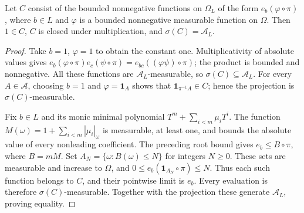 \begin{lemma}\label{lem:bounded-evaluation-generators}
\leanok
{}
Let $C$ consist of the bounded nonnegative functions on $\Omega_L$ of
the form $e_b(\varphi\circ\pi)$, where $b\in L$ and $\varphi$ is a
bounded nonnegative measurable function on $\Omega$. Then $1\in C$,
$C$ is closed under multiplication, and $\sigma(C)=\mathcal A_L$.
\end{lemma}
\begin{proof}
Take $b=1$, $\varphi=1$ to obtain the constant one. Multiplicativity
of absolute values gives
$e_b(\varphi\circ\pi)e_c(\psi\circ\pi)=e_{bc}((\varphi\psi)\circ\pi)$;
the product is bounded and nonnegative. All these functions are
$\mathcal A_L$-measurable, so $\sigma(C)\subseteq\mathcal A_L$.
For every $A\in\mathcal A$, choosing $b=1$ and $\varphi=\mathbf1_A$
shows that $\mathbf1_{\pi^{-1}A}\in C$; hence the projection is
$\sigma(C)$-measurable.

Fix $b\in L$ and its monic minimal polynomial
$T^m+\sum_{i<m}\mu_iT^i$. The function
$M(\omega)=1+\sum_{i<m}|\mu_i|_\omega$ is measurable, at least one,
and bounds the absolute value of every nonleading coefficient.
The preceding root bound gives $e_b\leq B\circ\pi$, where
$B=mM$. Set $A_N=\{\omega:B(\omega)\leq N\}$ for integers $N\geq0$.
These sets are measurable and increase to $\Omega$, and
$0\leq e_b(\mathbf1_{A_N}\circ\pi)\leq N$.
Thus each such function belongs to $C$, and their pointwise limit is
$e_b$. Every evaluation is therefore $\sigma(C)$-measurable. Together
with the projection these generate $\mathcal A_L$, proving equality.
\end{proof}

